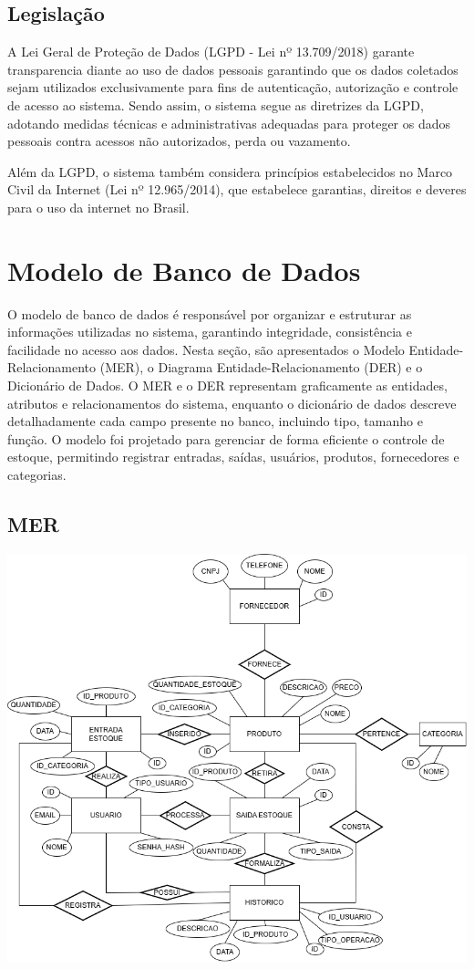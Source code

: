 \documentclass[
	12pt,				%
	openright,			%
	twoside,			%
	a4paper,			%
	english,			%
	french,				%
	spanish,			%
	brazil				%
	]{abntex2}
\begin{document}
\subsection{Legislação}

A  Lei Geral de Proteção de Dados (LGPD - Lei nº 13.709/2018) garante transparencia diante ao uso de dados pessoais garantindo que os dados coletados sejam utilizados exclusivamente para fins de autenticação, autorização e controle de acesso ao sistema. Sendo assim, o sistema segue as diretrizes da LGPD, adotando medidas técnicas e administrativas adequadas para proteger os dados pessoais contra acessos não autorizados, perda ou vazamento. 

Além da LGPD, o sistema também considera princípios estabelecidos no Marco Civil da Internet (Lei nº 12.965/2014), que estabelece garantias, direitos e deveres para o uso da internet no Brasil.




\section{Modelo de Banco de Dados}

O modelo de banco de dados é responsável por organizar e estruturar as informações utilizadas no sistema, garantindo integridade, consistência e facilidade no acesso aos dados. Nesta seção, são apresentados o Modelo Entidade-Relacionamento (MER), o Diagrama Entidade-Relacionamento (DER) e o Dicionário de Dados. O MER e o DER representam graficamente as entidades, atributos e relacionamentos do sistema, enquanto o dicionário de dados descreve detalhadamente cada campo presente no banco, incluindo tipo, tamanho e função. O modelo foi projetado para gerenciar de forma eficiente o controle de estoque, permitindo registrar entradas, saídas, usuários, produtos, fornecedores e categorias.

\subsection{MER}

\includegraphics[width=1.0\textwidth]{Figuras/MERestoque.png}
\end{document}
